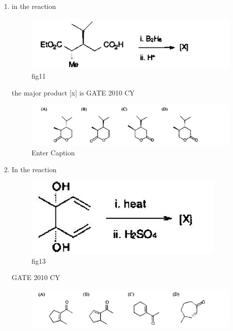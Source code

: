 \documentclass[journal,12pt,onecolumn]{IEEEtran}
\theoremstyle{remark}
\begin{document}
\begin{enumerate}
\begin{multicols}{2}
\begin{enumerate}
    \item $D_{4h}$ and ($C_{2v}$ and $C_{2h}$)
    \item $T_d$ and ($C_{2v}$ and $D_{4h}$)
    \item $D_{4h}$ and ($C_{2v}$ and $D_{4h}$)
    \item $T_d$ and ($C_{2v}$ and $C_{4v}$)
\end{enumerate}
\end{multicols}
\item 
in the reaction
\begin{figure}[H]
    \centering
    \includegraphics[width=0.5\linewidth]{figs/Q.34.png}
    \caption{fig11}
    \label{fig:figs/Q.34.png}
\end{figure}
the major product [x] is
\hfill{GATE 2010 CY}
\begin{figure}[H]
    \centering
    \includegraphics[width=0.75\linewidth]{figs/Q.35.1.png}
    \caption{Enter Caption}
    \label{fig:placeholder}
\end{figure}
\item 
In the reaction 
\begin{figure}[H]
    \centering
    \includegraphics[width=0.5\linewidth]{figs/Q.35.png}
    \caption{fig13}
    \label{fig:figs/Q.35.png}
\end{figure}
\hfill{GATE 2010 CY}
\begin{figure}[H]
    \centering
    \includegraphics[width=0.75\linewidth]{figs/Q.35.2.png}

\end{figure}
\end{enumerate}
\end{document}

